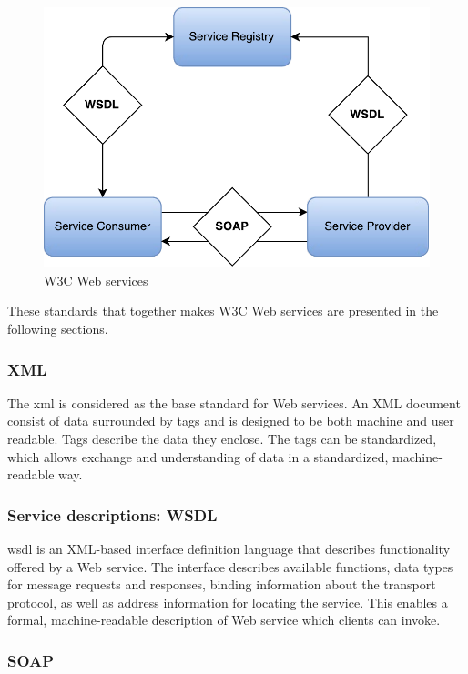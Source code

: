 \begin{figure}[h]
\includegraphics[scale=0.6]{images/web_services.pdf}
\caption{W3C Web services}
\label{figure-w3c-web-services}
\end{figure}

These standards that together makes W3C Web services are presented in the
following sections.

\subsubsection{XML}

The \gls{xml}\cite{W3C-XML} is considered as the base standard for Web services.
An XML document consist of data surrounded by tags and is designed to be both
machine and user readable. Tags describe the data they enclose. The tags can be
standardized, which allows exchange and understanding of data in a standardized,
machine-readable way.


\subsubsection{Service descriptions: WSDL}

\gls{wsdl} is an XML-based interface definition language that describes
functionality offered by a Web service\cite{w3c-wsdl}. The interface describes
available functions, data types for message requests and responses, binding
information about the transport protocol, as well as address information for
locating the service. This enables a formal, machine-readable description of Web
service which clients can invoke.

\subsubsection{SOAP}

